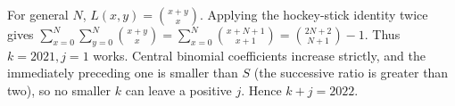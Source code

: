 For general $N$, $L(x,y)=\binom{x+y}{x}$. Applying the hockey-stick identity twice gives $\sum_{x=0}^N\sum_{y=0}^N\binom{x+y}{x}=\sum_{x=0}^N\binom{x+N+1}{x+1}=\binom{2N+2}{N+1}-1$. Thus $k=2021,j=1$ works. Central binomial coefficients increase strictly, and the immediately preceding one is smaller than $S$ (the successive ratio is greater than two), so no smaller $k$ can leave a positive $j$. Hence $\boxed{k+j=2022}$.
